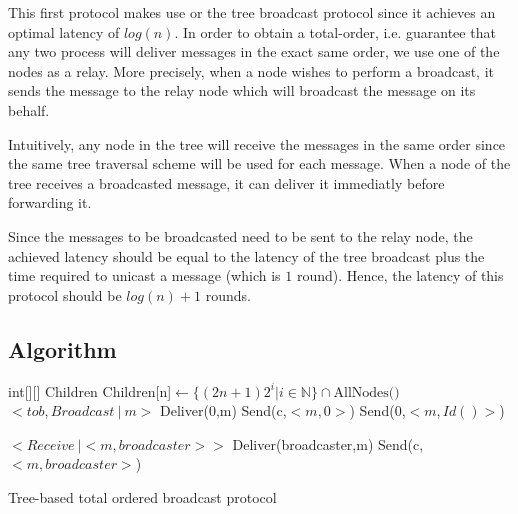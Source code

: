 \documentclass[a4paper]{article}
\begin{document}
        This first protocol makes use or the tree broadcast protocol since it achieves
        an optimal latency of $log(n)$. In order to obtain a total-order, i.e.
        guarantee that any two process will deliver messages in the exact same order,
        we use one of the nodes as a relay. More precisely, when a node wishes to
        perform a broadcast, it sends the message to the relay node which will
        broadcast the message on its behalf.

        Intuitively, any node in the tree will receive the messages in the same order
        since the same tree traversal scheme will be used for each message. When a
        node of the tree receives a broadcasted message, it can deliver it immediatly
        before forwarding it.

	Since the messages to be broadcasted need to be sent to the relay node, the
        achieved latency should be equal to the latency of the tree broadcast plus
        the time required to unicast a message (which is $1$ round). Hence, the
        latency of this protocol should be $log(n) + 1$ rounds.

        \subsection{Algorithm}
        \begin{algorithm}[H]
            \centering
            \begin{algorithmic}[5]
                \Data
		\State int[][] Children
                \EndData
                \Init
		\State Children[n]$\gets\{(2n + 1)2^i | i \in \mathbb{N}\} \cap \text{AllNodes()}$
		\EndFor
                \EndInit
                \Event $< tob,Broadcast\ |\ m> $
                \State Deliver(0,m)
                \State Send(c,$<m,0>$)
		\EndFor
		\Else
		\State Send(0,$<m,Id()>$)
	        \EndIf
                \EndEvent

                \Event $<Receive\ | <m,broadcaster>>$
                \State Deliver(broadcaster,m)
                \State Send(c,$<m,broadcaster>$)
		\EndFor
                \EndEvent
            \end{algorithmic}
            \caption{Tree-based total ordered broadcast protocol}
        \end{algorithm}
\end{document}
